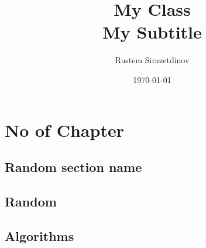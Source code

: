 \documentclass[a4paper,14pt]{article}
\title{\Huge{My Class}\\My Subtitle}
\author{\huge{Rustem Sirazetdinov}}
\date{\today}
\begin{document}
    \maketitle
    \newpage
    \tableofcontents
    \pagebreak

    \chapter{No of Chapter}
    \section{Random section name}

    \section{Random}
    \section{Algorithms}
\end{document}
